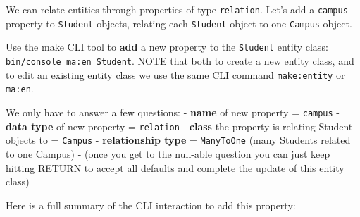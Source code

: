 \documentclass[a4paperpaper,openright]{book}
\begin{document}
We can relate entities through properties of type \texttt{relation}.
Let's add a \texttt{campus} property to \texttt{Student} objects,
relating each \texttt{Student} object to one \texttt{Campus} object.

Use the make CLI tool to \textbf{add} a new property to the
\texttt{Student} entity class: \texttt{bin/console\ ma:en\ Student}.
NOTE that both to create a new entity class, and to edit an existing
entity class we use the same CLI command \texttt{make:entity} or
\texttt{ma:en}.

We only have to answer a few questions: - \textbf{name} of new property
= \texttt{campus} - \textbf{data type} of new property =
\texttt{relation} - \textbf{class} the property is relating Student
objects to = \texttt{Campus} - \textbf{relationship type} =
\texttt{ManyToOne} (many Students related to one Campus) - (once you get
to the null-able question you can just keep hitting RETURN to accept all
defaults and complete the update of this entity class)

Here is a full summary of the CLI interaction to add this property:
\end{document}
